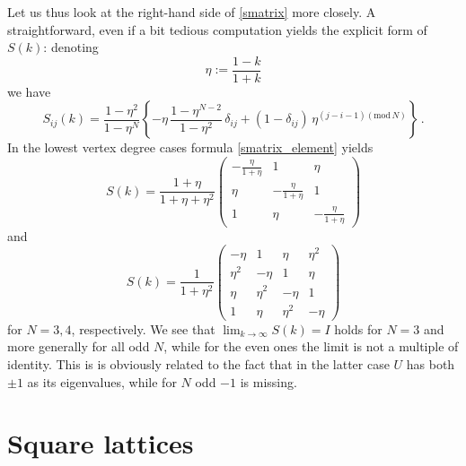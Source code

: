 \documentclass[english]{elsarticle}
\begin{document}
Let us thus look at the right-hand side of \eqref{smatrix} more closely. A straightforward, even if a bit tedious computation yields the explicit form of $S(k)$: denoting
$$
\eta := \frac{1-k}{1+k}
$$
we have
\begin{equation} \label{smatrix_element}
S_{ij}(k) = \frac{1-\eta^2}{1-\eta^N} \left\{ -\eta\, \frac{1-\eta^{N-2}}{1-\eta^2}\,\delta_{ij} +
(1-\delta_{ij})\, \eta^{(j-i-1)(\mathrm{mod}\,N)} \right\}\,.
\end{equation}
In the lowest vertex degree cases formula \eqref{smatrix_element} yields
\begin{equation} \label{smatrix3}
S(k)= \frac{1+\eta}{1+\eta+\eta^2} \left( \begin{array}{ccc}
-\frac{\eta}{1+\eta} & 1 & \eta \\ \eta & -\frac{\eta}{1+\eta} & 1 \\ 1 & \eta & -\frac{\eta}{1+\eta}
\end{array} \right)
\end{equation}
and
\begin{equation} \label{smatrix4}
S(k)= \frac{1}{1+\eta^2} \left( \begin{array}{cccc}
-\eta & 1 & \eta & \eta^2 \\ \eta^2 & -\eta & 1 & \eta \\ \eta & \eta^2 & -\eta & 1 \\ 1 & \eta & \eta^2 & -\eta
\end{array} \right)
\end{equation}
for $N=3,4$, respectively. We see that $\lim_{k\to\infty} S(k)=I$
holds for $N=3$ and more generally for all odd $N$, while for the
even ones the limit is not a multiple of identity. This is is
obviously related to the fact that in the latter case $U$ has both
$\pm 1$ as its eigenvalues, while for $N$ odd $-1$ is missing.

\section{Square lattices} \label{s:square}
\end{document}
